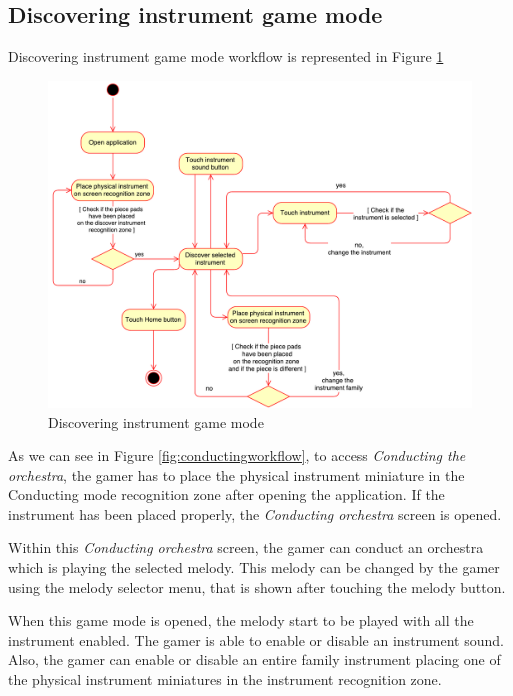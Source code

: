 \FloatBarrier

\newpage
\subsection{Discovering instrument game mode}
\label{subsec:discoverinstrument_arch}

Discovering instrument game mode workflow is represented in Figure \ref{fig:discoveringworkflow}

\begin{figure}[ht!]
	\centering
	\includegraphics[width=400pt]{graphics/architecture/DiscoveringGameMode.pdf}
	\caption{Discovering instrument game mode}
	\label{fig:discoveringworkflow}
\end{figure}

As we can see in Figure \ref{fig:conductingworkflow}, to access \textit{Conducting the orchestra}, the gamer has to place the physical instrument miniature in the Conducting mode recognition zone after opening the application. If the instrument has been placed properly, the \textit{Conducting orchestra} screen is opened.

Within this \textit{Conducting orchestra} screen, the gamer can conduct an orchestra which is playing the selected melody. This melody can be changed by the gamer using the melody selector menu, that is shown after touching the melody button.

When this game mode is opened, the melody start to be played with all the instrument enabled. The gamer is able to enable or disable an instrument sound. Also, the gamer can enable or disable an entire family instrument placing one of the physical instrument miniatures in the instrument recognition zone.

